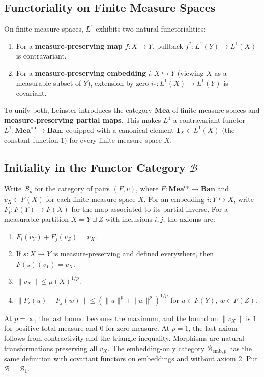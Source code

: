 \subsection{Functoriality on Finite Measure Spaces}

On finite measure spaces, $L^1$ exhibits two natural functorialities:
\begin{enumerate}
    \item For a \textbf{measure-preserving map} $f : X \to Y$, pullback $f^* : L^1(Y) \to L^1(X)$ is contravariant.
    \item For a \textbf{measure-preserving embedding} $i : X \hookrightarrow Y$ (viewing $X$ as a measurable subset of $Y$), extension by zero $i_* : L^1(X) \to L^1(Y)$ is covariant.
\end{enumerate}

To unify both, Leinster introduces the category $\mathbf{Mea}$ of finite measure spaces and \textbf{measure-preserving partial maps}. This makes $L^1$ a contravariant functor $L^1 : \mathbf{Mea}^{\mathrm{op}} \to \mathbf{Ban}$, equipped with a canonical element $\mathbf{1}_X \in L^1(X)$ (the constant function $1$) for every finite measure space $X$.

\subsection{Initiality in the Functor Category $\mathcal{B}$}

Write $\mathcal B_p$ for the category of pairs $(F,v)$, where $F:\mathbf{Mea}^{\mathrm{op}}\to\mathbf{Ban}$ and $v_X\in F(X)$ for each finite measure space $X$. For an embedding $i:Y\hookrightarrow X$, write $F_i:F(Y)\to F(X)$ for the map associated to its partial inverse. For a measurable partition $X=Y\sqcup Z$ with inclusions $i,j$, the axioms are:
\begin{enumerate}
 \item $F_i(v_Y)+F_j(v_Z)=v_X$.
 \item If $s:X\to Y$ is measure-preserving and defined everywhere, then $F(s)(v_Y)=v_X$.
 \item $\|v_X\|\leq\mu(X)^{1/p}$.
 \item $\|F_i(u)+F_j(w)\|\leq(\|u\|^p+\|w\|^p)^{1/p}$ for $u\in F(Y)$, $w\in F(Z)$.
\end{enumerate}
At $p=\infty$, the last bound becomes the maximum, and the bound on $\|v_X\|$ is $1$ for positive total measure and $0$ for zero measure. At $p=1$, the last axiom follows from contractivity and the triangle inequality. Morphisms are natural transformations preserving all $v_X$. The embedding-only category $\mathcal B_{\mathrm{emb},p}$ has the same definition with covariant functors on embeddings and without axiom 2. Put $\mathcal B=\mathcal B_1$.

